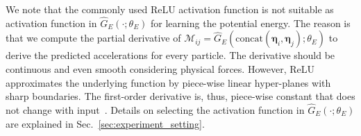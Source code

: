 \documentclass{article}
\newtheorem{remark}[theorem]{Remark}
\begin{document}

We note that the commonly used ReLU activation function is not suitable as activation function in $\hat{G}_E(\cdot; \theta_{E})$ for learning the potential energy. The reason is that we compute the partial derivative of $\mathcal{M}_{ij} = \hat{G}_E(\text{concat}(\bm{\eta}_i, \bm{\eta}_j); \theta_{E})$ to derive the predicted accelerations for every particle. The derivative should be continuous and even smooth considering physical forces. However, ReLU approximates the underlying function by piece-wise linear hyper-planes with sharp boundaries. The first-order derivative is, thus, piece-wise constant that does not change with input~\cite{hu2021forcenet}.
Details on selecting the activation function in $\hat{G}_E(\cdot; \theta_{E})$ are explained in Sec.~\ref{sec:experiment_setting}.
\end{document}
